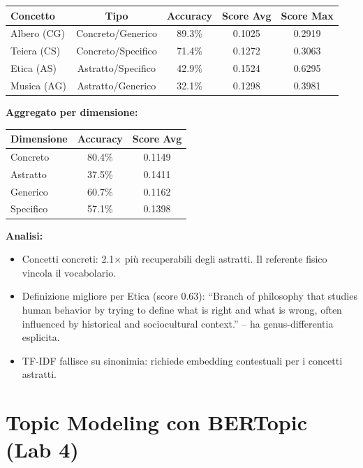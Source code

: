 \documentclass[12pt,a4paper]{article}
\begin{document}
\begin{resultbox}
\begin{center}
\begin{tabular}{lcccc}
\toprule
\textbf{Concetto} & \textbf{Tipo} & \textbf{Accuracy} & \textbf{Score Avg} & \textbf{Score Max} \\
\midrule
Albero (CG)  & Concreto/Generico  & 89.3\% & 0.1025 & 0.2919 \\
Teiera (CS)  & Concreto/Specifico & 71.4\% & 0.1272 & 0.3063 \\
Etica (AS)   & Astratto/Specifico & 42.9\% & 0.1524 & 0.6295 \\
Musica (AG)  & Astratto/Generico  & 32.1\% & 0.1298 & 0.3981 \\
\bottomrule
\end{tabular}
\end{center}

\bigskip
\textbf{Aggregato per dimensione:}
\begin{center}
\begin{tabular}{lcc}
\toprule
\textbf{Dimensione} & \textbf{Accuracy} & \textbf{Score Avg} \\
\midrule
Concreto & 80.4\% & 0.1149 \\
Astratto & 37.5\% & 0.1411 \\
Generico & 60.7\% & 0.1162 \\
Specifico & 57.1\% & 0.1398 \\
\bottomrule
\end{tabular}
\end{center}
\end{resultbox}

\textbf{Analisi:}
\begin{itemize}
  \item Concetti concreti: 2.1$\times$ pi\`u recuperabili degli astratti. Il referente fisico vincola il vocabolario.
  \item Definizione migliore per Etica (score 0.63): ``Branch of philosophy that studies human behavior by trying to define what is right and what is wrong, often influenced by historical and sociocultural context.'' -- ha genus-differentia esplicita.
  \item TF-IDF fallisce su sinonimia: richiede embedding contestuali per i concetti astratti.
\end{itemize}

\section{Topic Modeling con BERTopic (Lab 4)}
\end{document}
